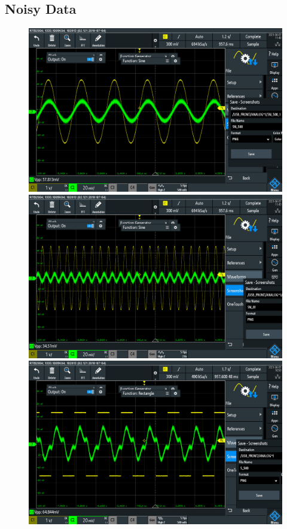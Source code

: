 \documentclass[journal]{Imperial_lab_report}
\begin{document}
    \begin{appendices}
        \newpage
        \section{Noisy Data}
        \begin{figure}[h]
            
            \centering
            \includegraphics[scale = 0.10]{G2_N_500_pic.PNG}
            \includegraphics[scale = 0.10]{G2_N_2000_pic.PNG}
            \includegraphics[scale = 0.10]{G2_S_500_pic.PNG}

\end{figure}
\end{appendices}
\end{document}
